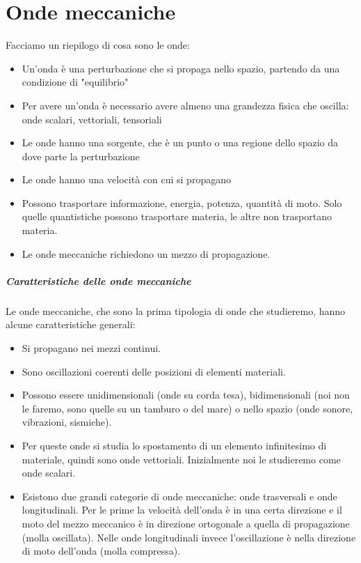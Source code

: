 \chapter{Onde meccaniche}

Facciamo un riepilogo di cosa sono le onde:
\begin{itemize}
	
	\item Un'onda è una perturbazione che si propaga nello spazio, partendo da una condizione di "equilibrio"
	\item Per avere un'onda è necessario avere almeno una grandezza fisica che oscilla: onde scalari, vettoriali, tensoriali
	\item Le onde hanno una sorgente, che è un punto o una regione dello spazio da dove parte la perturbazione
	\item Le onde hanno una velocità con cui si propagano
	\item Possono trasportare informazione, energia, potenza, quantità di moto. Solo quelle quantistiche possono trasportare materia, le altre non trasportano materia.
	\item Le onde meccaniche richiedono un mezzo di propagazione.
\end{itemize}

\paragraph{Caratteristiche delle onde meccaniche} Le onde meccaniche, che sono la prima tipologia di onde che studieremo, hanno alcune caratteristiche generali:
\begin{itemize}
	
	\item Si propagano nei mezzi continui.
	\item Sono oscillazioni coerenti delle posizioni di elementi materiali.
	\item Possono essere unidimensionali (onde su corda tesa), bidimensionali (noi non le faremo, sono quelle su un tamburo o del mare) o nello spazio (onde sonore, vibrazioni, sismiche).
	\item Per queste onde si studia lo spostamento di un elemento infinitesimo di materiale, quindi sono onde vettoriali. Inizialmente noi le studieremo come onde scalari.
	\item Esistono due grandi categorie di onde meccaniche: onde trasversali e onde longitudinali. Per le prime la velocità dell'onda è in una certa direzione e il moto del mezzo meccanico è in direzione ortogonale a quella di propagazione (molla oscillata). Nelle onde longitudinali invece l'oscillazione è nella direzione di moto dell'onda (molla compressa).
\end{itemize}

